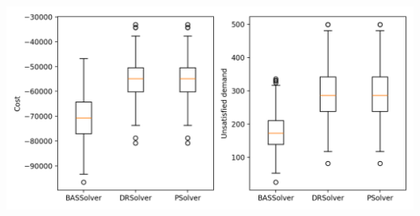 \documentclass{beamer}
\begin{document}
\begin{frame}[allowframebreaks]
	\framebreak
	\includegraphics[width=\textwidth]{../figure/benchmark.png}
\end{frame}

\end{document}

